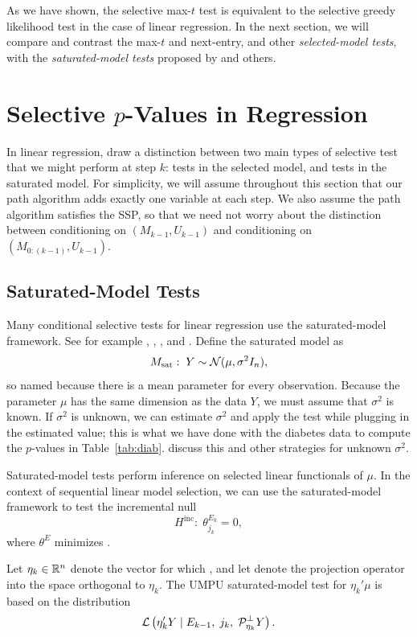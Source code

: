 \documentclass{article}
\begin{document}
As we have shown, the selective max-$t$ test is equivalent to the selective greedy likelihood test in the case of linear regression. In the next section, we will compare and contrast the max-$t$ and next-entry, and other {\em selected-model tests}, with the {\em saturated-model tests} proposed by \citet{taylor2014exact} and others. 

\section{Selective $p$-Values in Regression}
\label{sec:selective-reg}
In linear regression, \citet{fithian2014optimal} draw a distinction between two main types of selective test that we might perform at step $k$: tests in the selected model, and tests in the saturated model. For simplicity, we will assume throughout this section that our path algorithm adds exactly one variable at each step. We also assume the path algorithm satisfies the SSP, so that we need not worry about the distinction between conditioning on $(M_{k-1}, U_{k-1})$ and conditioning on $(M_{0:(k-1)}, U_{k-1})$.

\subsection{Saturated-Model Tests}
Many conditional selective tests for linear regression use the saturated-model framework. See for example \citet{taylor2013tests}, \citet{taylor2014exact}, \citet{lee2013exact}, and \citet{loftus2014significance}. Define the saturated model as
\[
M_{\text{sat}}:\; Y \sim \mathcal{N}(\mu, \sigma^2I_n),
\]
so named because there is a mean parameter for every observation. Because the parameter $\mu$ has the same dimension as the data $Y$, we must assume that $\sigma^2$ is known. If $\sigma^2$ is unknown, we can estimate $\sigma^2$ and apply the test while plugging in the estimated value; this is what we have done with the diabetes data to compute the $p$-values in Table~\ref{tab:diab}.  \citet{tibshirani2015uniform} discuss this and other strategies for unknown $\sigma^2$.

Saturated-model tests perform inference on selected linear functionals of $\mu$. In the context of sequential linear model selection,  we can use the saturated-model framework to test the incremental null 
\[
H^{\text{inc}}:\; \theta_{j_k}^{E_k} = 0,
\]
where $\theta^E$ minimizes .

Let $\eta_k\in \mathbb{R}^n$ denote the vector for which , and let  denote the projection operator into the space orthogonal to $\eta_k$. The UMPU saturated-model test for $\eta_k'\mu$ is based on the distribution
\begin{equation*}
\mathcal{L}\left( \eta_k'Y \mid E_{k-1}, \;j_k, \;\mathcal{P}_{\eta_k}^\perp Y \right).
\end{equation*}
\end{document}
